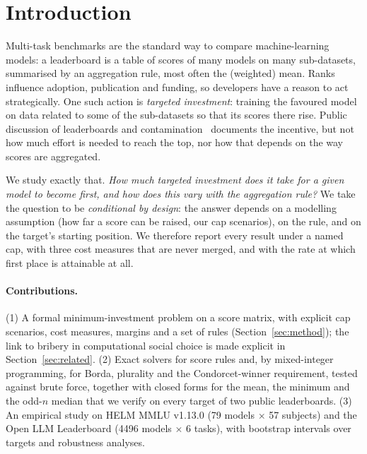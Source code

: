\section{Introduction}
\label{sec:intro}
Multi-task benchmarks are the standard way to compare machine-learning models: a leaderboard is a table of scores of many models on many sub-datasets, summarised by an aggregation rule, most often the (weighted) mean. Ranks influence adoption, publication and funding, so developers have a reason to act strategically. One such action is \emph{targeted investment}: training the favoured model on data related to some of the sub-datasets so that its scores there rise. Public discussion of leaderboards and contamination~\citep{singh2025illusion,zhou2023cheater,yang2023rephrased} documents the incentive, but not how much effort is needed to reach the top, nor how that depends on the way scores are aggregated.

We study exactly that. \emph{How much targeted investment does it take for a given model to become first, and how does this vary with the aggregation rule?} We take the question to be \emph{conditional by design}: the answer depends on a modelling assumption (how far a score can be raised, our cap scenarios), on the rule, and on the target's starting position. We therefore report every result under a named cap, with three cost measures that are never merged, and with the rate at which first place is attainable at all.

\paragraph{Contributions.}
(1) A formal minimum-investment problem on a score matrix, with explicit cap scenarios, cost measures, margins and a set of rules (Section~\ref{sec:method}); the link to bribery in computational social choice is made explicit in Section~\ref{sec:related}.
(2) Exact solvers for score rules and, by mixed-integer programming, for Borda, plurality and the Condorcet-winner requirement, tested against brute force, together with closed forms for the mean, the minimum and the odd-$n$ median that we verify on every target of two public leaderboards.
(3) An empirical study on HELM MMLU v1.13.0 (79 models $\times$ 57 subjects) and the Open LLM Leaderboard (4496 models $\times$ 6 tasks), with bootstrap intervals over targets and robustness analyses.

